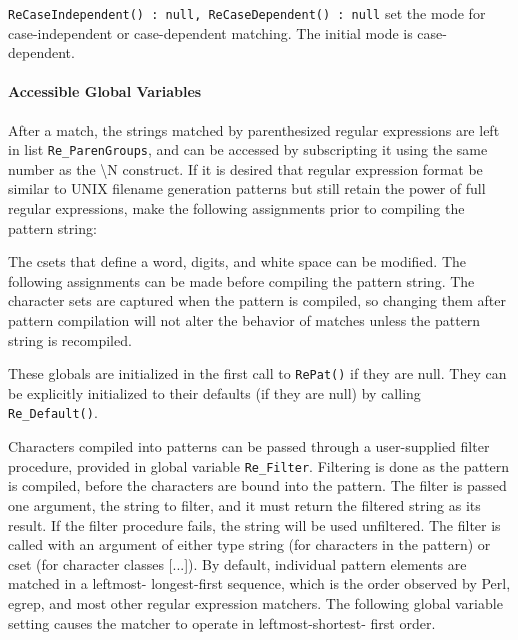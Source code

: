 \texttt{ReCaseIndependent() : null, ReCaseDependent() : null} set the
mode for case-independent or case-dependent matching. The initial mode
is case-dependent.

\paragraph{Accessible Global Variables}
After a match, the strings matched by parenthesized regular expressions
are left in list \texttt{Re\_ParenGroups}, and can be accessed by
subscripting it using the same number as the {\textbackslash}N
construct. If it is desired that regular expression format be similar
to UNIX filename generation patterns but still retain the power of full
regular expressions, make the following assignments prior to compiling
the pattern string:


The csets that define a word, digits, and white
space can be modified. The following assignments can be made before
compiling the pattern string. The character sets are captured when the
pattern is compiled, so changing them after pattern compilation will
not alter the behavior of matches unless the pattern string is
recompiled.


These globals are initialized in the first call to \texttt{RePat()} if
they are null. They can be explicitly initialized to their defaults (if
they are null) by calling \texttt{Re\_Default()}.

Characters compiled into patterns can be passed through a user-supplied
filter procedure, provided in global variable \texttt{Re\_Filter}.
Filtering is done as the pattern is compiled, before the characters are
bound into the pattern. The filter is passed one argument, the string
to filter, and it must return the filtered string as its result. If the
filter procedure fails, the string will be used unfiltered. The filter
is called with an argument of either type string (for characters in the
pattern) or cset (for character classes [...]). By default, individual
pattern elements are matched in a {\textquotedbl}leftmost-
longest-first{\textquotedbl} sequence, which is the order observed by
Perl, egrep, and most other regular expression
matchers. The following global variable setting causes the matcher to
operate in leftmost-shortest- first order.

